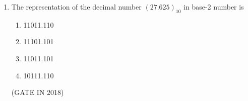 
\begin{enumerate}
\item
\label{prob:gate IN 18}
The representation of the decimal number $(27.625)_{10}$ in base-2 number is
\begin{enumerate}[label=(\Alph*)]
    \item 11011.110
    \item 11101.101
    \item 11011.101
    \item 10111.110
\end{enumerate}
\hfill(GATE IN 2018)

\end{enumerate}
